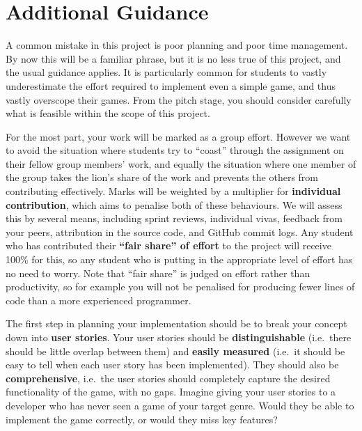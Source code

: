 \documentclass{../fal_assignment}
\begin{document}
\section*{Additional Guidance}

A common mistake in this project is poor planning and poor time management.
By now this will be a familiar phrase,
but it is no less true of this project, and the usual guidance applies.
It is particularly common for students to
vastly underestimate the effort required to implement even a simple game,
and thus vastly overscope their games.
From the pitch stage, you should consider carefully what is feasible within the scope of this project.

For the most part, your work will be marked as a group effort.
However we want to avoid the situation where students try to ``coast'' through the assignment
on their fellow group members' work,
and equally the situation where one member of the group takes the lion's share of the work
and prevents the others from contributing effectively.
Marks will be weighted by a multiplier for \textbf{individual contribution},
which aims to penalise both of these behaviours.
We will assess this by several means, including sprint reviews, individual vivas, feedback from your peers,
attribution in the source code, and GitHub commit logs.
Any student who has contributed their \textbf{``fair share'' of effort} to the project will receive 100\% for this,
so any student who is putting in the appropriate level of effort has no need to worry.
Note that ``fair share'' is judged on effort rather than productivity,
so for example you will not be penalised for producing fewer lines of code than a more experienced programmer.

The first step in planning your implementation should be to break your concept down into \textbf{user stories}. 
Your user stories should be \textbf{distinguishable} (i.e.\ there should be little overlap between them)
and \textbf{easily measured} (i.e.\ it should be easy to tell when each user story has been implemented).
They should also be \textbf{comprehensive}, i.e.\ the user stories should completely capture the
desired functionality of the game, with no gaps.
Imagine giving your user stories to a developer who has never seen a game of your target genre.
Would they be able to implement the game correctly, or would they miss key features?

\end{document}

